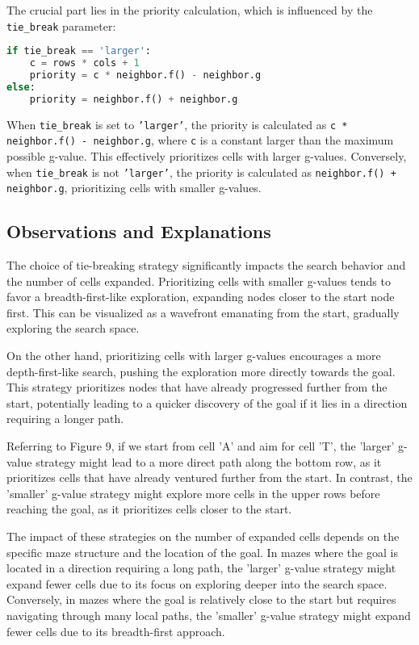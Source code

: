 \documentclass[12pt]{article}
\begin{document}
The crucial part lies in the priority calculation, 
which is influenced by the \texttt{tie\_break} parameter:

\begin{lstlisting}[language=Python, basicstyle=\ttfamily]
if tie_break == 'larger':
    c = rows * cols + 1
    priority = c * neighbor.f() - neighbor.g
else:
    priority = neighbor.f() + neighbor.g
\end{lstlisting}

When \texttt{tie\_break} is set to \texttt{'larger'}, 
the priority is calculated as  \texttt{c * neighbor.f() - neighbor.g}, 
where \texttt{c} is a constant larger than the maximum possible g-value. 
This effectively prioritizes cells with larger g-values. 
Conversely, 
when \texttt{tie\_break} is not \texttt{'larger'}, 
the priority is calculated as \texttt{neighbor.f() + neighbor.g}, 
prioritizing cells with smaller g-values.

\subsection{Observations and Explanations}

The choice of tie-breaking strategy significantly impacts the search behavior and the number of cells expanded. 
Prioritizing cells with smaller g-values tends to favor a breadth-first-like exploration, 
expanding nodes closer to the start node first. 
This can be visualized as a wavefront emanating from the start, 
gradually exploring the search space.

On the other hand, prioritizing cells with larger g-values encourages a more depth-first-like search, 
pushing the exploration more directly towards the goal. 
This strategy prioritizes nodes that have already progressed further from the start, 
potentially leading to a quicker discovery of the goal if it lies in a direction requiring a longer path.

Referring to Figure 9, 
if we start from cell 'A' and aim for cell 'T', 
the 'larger' g-value strategy might lead to a more direct path along the bottom row, 
as it prioritizes cells that have already ventured further from the start. 
In contrast, 
the 'smaller' g-value strategy might explore more cells in the upper rows before reaching the goal, 
as it prioritizes cells closer to the start.

The impact of these strategies on the number of expanded cells depends on the specific maze structure and the location of the goal. 
In mazes where the goal is located in a direction requiring a long path, 
the 'larger' g-value strategy might expand fewer cells due to its focus on exploring deeper into the search space. 
Conversely, 
in mazes where the goal is relatively close to the start but requires navigating through many local paths, 
the 'smaller' g-value strategy might expand fewer cells due to its breadth-first approach.
\end{document}

